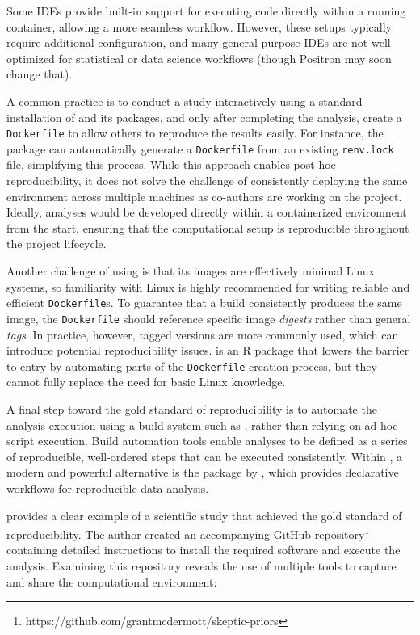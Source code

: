 \documentclass[
  article]{jss}
\begin{document}
Some IDEs provide built-in support for executing code directly within a
running container, allowing a more seamless workflow. However, these
setups typically require additional configuration, and many
general-purpose IDEs are not well optimized for statistical or data
science workflows (though Positron may soon change that).

A common practice is to conduct a study interactively using a standard
installation of  and its packages, and only after completing
the analysis, create a \texttt{Dockerfile} to allow others to reproduce
the results easily. For instance, the  package
\citep{dockerfiler} can automatically generate a \texttt{Dockerfile}
from an existing \texttt{renv.lock} file, simplifying this process.
While this approach enables post-hoc reproducibility, it does not solve
the challenge of consistently deploying the same environment across
multiple machines as co-authors are working on the project. Ideally,
analyses would be developed directly within a containerized environment
from the start, ensuring that the computational setup is reproducible
throughout the project lifecycle.

Another challenge of using  is that its images are
effectively minimal Linux systems, so familiarity with Linux is highly
recommended for writing reliable and efficient \texttt{Dockerfile}s. To
guarantee that a build consistently produces the same image, the
\texttt{Dockerfile} should reference specific image \emph{digests}
rather than general \emph{tags}. In practice, however, tagged versions
are more commonly used, which can introduce potential reproducibility
issues.  is an R package that lowers the barrier to
entry by automating parts of the \texttt{Dockerfile} creation process,
but they cannot fully replace the need for basic Linux knowledge.

A final step toward the gold standard of reproducibility is to automate
the analysis execution using a build system such as , rather
than relying on ad hoc script execution. Build automation tools enable
analyses to be defined as a series of reproducible, well-ordered steps
that can be executed consistently. Within , a modern and
powerful alternative is the  package by \citet{landau2021},
which provides declarative workflows for reproducible data analysis.

\citet{mcdermott2021} provides a clear example of a scientific study
that achieved the gold standard of reproducibility. The author created
an accompanying GitHub repository\footnote{https://github.com/grantmcdermott/skeptic-priors}
containing detailed instructions to install the required software and
execute the analysis. Examining this repository reveals the use of
multiple tools to capture and share the computational environment:
\end{document}
